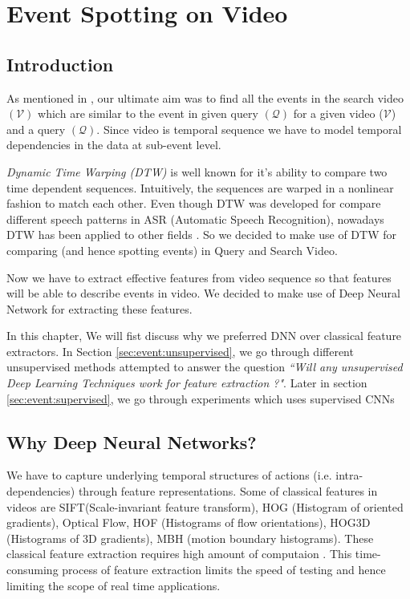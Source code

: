 \chapter{Event Spotting on Video}
\label{chap:event}

\section{Introduction}
As mentioned in , our ultimate aim was to find all the events in the search video $(\mathcal{V})$ which are similar to the event in given query $(\mathcal{Q})$  for a given video ($\mathcal{V}$) and a query $(\mathcal{Q})$. Since video is temporal sequence we have to model temporal dependencies
in the data at sub-event level. 

\textit{Dynamic Time Warping (DTW)} is well known for it's ability to compare two time dependent sequences. Intuitively, the sequences are warped in a nonlinear fashion to match each other. Even though DTW was developed for compare different speech patterns in ASR (Automatic Speech Recognition), nowadays DTW has been applied to other fields \cite{muller2007information}.  So we decided to make use of DTW for comparing (and hence spotting events) in Query and Search Video.

Now we have to extract effective features from video sequence so that features will be able to describe events  in video. We decided to make use of Deep Neural Network for extracting these features. 

In this chapter, We will fist discuss why we preferred  DNN over classical feature extractors. In Section \ref{sec:event:unsupervised}, we go through different unsupervised methods attempted to answer the question \textit{``Will any unsupervised Deep Learning Techniques work for feature extraction ?"}. Later in section \ref{sec:event:supervised}, we go through experiments which uses supervised CNNs  

\section{Why Deep Neural Networks?}
\label{sec:event:why}
We have to capture underlying temporal structures of actions (i.e. intra-dependencies) through feature representations. Some of classical features in videos are SIFT(Scale-invariant feature transform), HOG (Histogram of oriented gradients), Optical Flow, HOF (Histograms of flow orientations), HOG3D (Histograms of 3D gradients), MBH (motion boundary histograms). These classical feature extraction requires high amount of computaion \cite{baker2011database,chatfield2011devil}. This time-consuming process of feature extraction limits the speed of testing and hence limiting the scope of real time applications.

